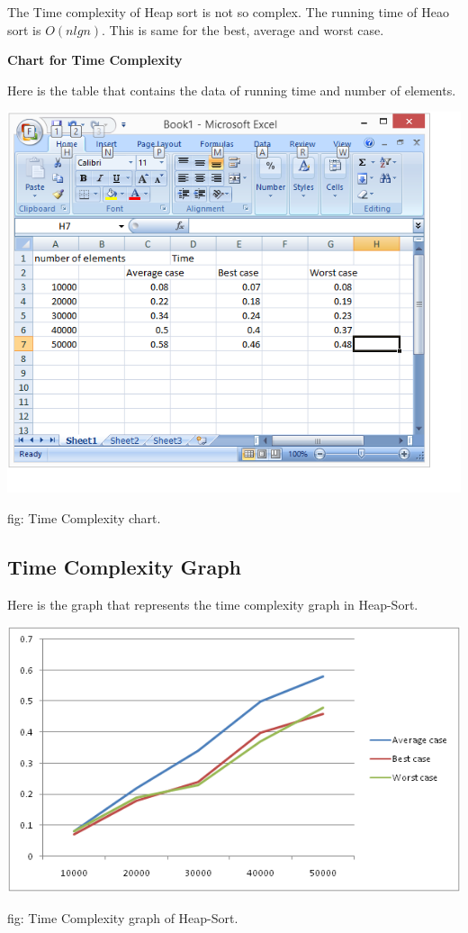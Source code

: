 \documentclass[9 pt]{report}
\begin{document}
The Time complexity of Heap sort is not so complex. The running time of Heao sort is $O(nlgn)$. This is same for the best, average and worst case.

\textbf{Chart for Time Complexity}

Here is the table that contains the data of running time and number of elements.

\vspace{1cm}


\includegraphics{heapdata.png}

\hspace{5cm}fig: Time Complexity chart.

\subsection{\huge Time Complexity Graph}

Here is the graph that represents the time complexity graph in Heap-Sort.

\vspace{1cm}

\includegraphics{heapsort.png}

\hspace{5cm}fig: Time Complexity graph of Heap-Sort.
\end{document}
